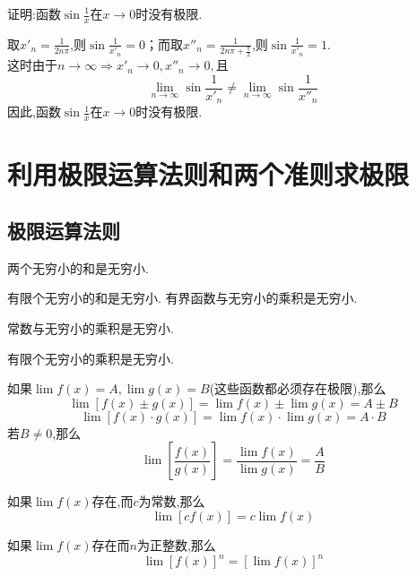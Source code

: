 \example[证明函数的极限不存在]
\sj \examples 证明:函数$\displaystyle \sin \frac{1}{x}$在$x\to 0$时没有极限.

\proof 取$\displaystyle x'_n=\frac{1}{2n\pi }$,则$\displaystyle \sin \frac{1}{x'_n}=0$；而取$\displaystyle x''_n=\frac{1}{2n\pi+\frac{\pi}{2} }$,则$\displaystyle \sin \frac{1}{x'_n}=1.$\\[0.5em]
这时由于$n \to \infty \Rightarrow x'_n\to 0,x''_n \to 0, $且
\begin{equation*}
\lim\limits_{n \to \infty} \sin \frac{1}{x'_n} \ne \lim\limits_{n \to \infty} \sin \frac{1}{x''_n} 
\end{equation*}
因此,函数$\displaystyle \sin \frac{1}{x}$在$x\to 0$时没有极限.

\section{利用极限运算法则和两个准则求极限}
\subsection{极限运算法则}
\ttheorem[极限运算法则1]
两个无穷小的和是无穷小.

\tl 有限个无穷小的和是无穷小.
\newpage
\theorem[极限运算法则2]
有界函数与无穷小的乘积是无穷小.

\tl 常数与无穷小的乘积是无穷小.

\tl 有限个无穷小的乘积是无穷小.\jg

\theorem[极限运算法则3]
如果$\lim f(x) = A, \lim g(x) = B$(这些函数都必须存在极限),那么
\begin{equation}
\lim [f(x)\pm g(x)]=\lim f(x)\pm \lim g(x)=A \pm B
\end{equation}
\begin{equation}
\lim[f(x)\cdot g(x)]=\lim f(x)\cdot \lim g(x)=A\cdot B
\end{equation}
若$B\ne 0$,那么
\begin{equation}
\lim \left[ \frac{f(x)}{g(x)}\right] =\frac{\lim f(x)}{\lim g(x)}=\frac{A}{B}
\end{equation}

\tl 如果$\lim f(x)$存在,而$c$为常数,那么
\begin{equation}
\lim [cf(x)]=c \lim f(x)
\end{equation}

\tl 如果$\lim f(x)$存在而$n$为正整数,那么
\begin{equation}
\lim [f(x)]^n=[\lim f(x)]^n
\end{equation}

